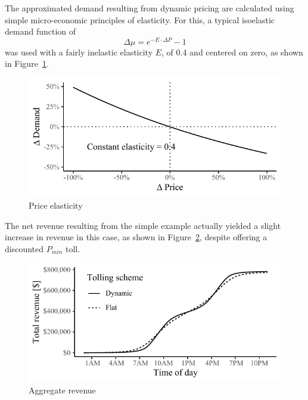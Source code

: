 \documentclass[10pt, letter, twocolumn]{article} %
\begin{document}
The approximated demand resulting from dynamic pricing are calculated using simple micro-economic principles of elasticity. For this, a typical isoelastic demand function of
  \begin{equation}
 \Delta\mu = e^{-E \cdot \Delta P} - 1
 \end{equation} 
 was used with a fairly inelastic elasticity $E$, of 0.4 and centered on zero, as shown in Figure~\ref{fig:toyelasticity}.
  
  \begin{figure}[h]
 	\centering
 	\includegraphics[width=\linewidth]{figures/toyelasticity}
 	\caption{Price elasticity}
 	\label{fig:toyelasticity}
 \end{figure}
 
  
The net revenue resulting from the simple example actually yielded a slight increase in revenue in this case, as shown in Figure~\ref{fig:toyrevenue}, despite offering a discounted $P_{min}$ toll.
 
 \begin{figure}[h]
 	\centering
 	\includegraphics[width=\linewidth]{figures/toyrevenue}
 	\caption{Aggregate revenue}
 	\label{fig:toyrevenue}
 \end{figure}
 
\end{document}
